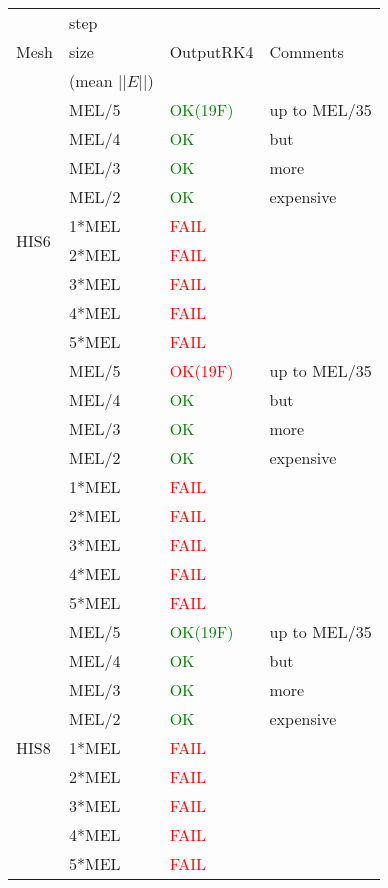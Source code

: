 \documentclass{article}
\begin{document}




\begin{tabular}{ |l|l|l|l| }
\hline
\multirow{3}{*}{Mesh} & step  & \multirow{3}{*}{OutputRK4}  & \multirow{3}{*}{Comments} \\
 & size & & \\
 & (mean $||E||$) & & \\ \hline

 
\multirow{10}{*}{HIS6} & MEL/5 & \textcolor{green}{OK(19F)}& up to MEL/35\\ 
& MEL/4 & \textcolor{green}{OK} & but \\
 & MEL/3 &  \textcolor{green}{OK} & more \\
 & MEL/2 &  \textcolor{green}{OK} & expensive\\
 & 1*MEL &    \textcolor{red}{FAIL} & \\ 
 & 2*MEL & \textcolor{red}{FAIL} & \\
 & 3*MEL &  \textcolor{red}{FAIL} & \\
 & 4*MEL &  \textcolor{red}{FAIL} & \\
 & 5*MEL &    \textcolor{red}{FAIL} & \\ \hline
 
\multirow{10}{*}{HIS7} & MEL/5 & \textcolor{red}{OK(19F)}& up to MEL/35\\ 
& MEL/4 & \textcolor{green}{OK} & but \\
 & MEL/3 &  \textcolor{green}{OK} & more \\
 & MEL/2 &  \textcolor{green}{OK} & expensive\\
 & 1*MEL &    \textcolor{red}{FAIL} & \\ 
 & 2*MEL & \textcolor{red}{FAIL} & \\
 & 3*MEL &  \textcolor{red}{FAIL} & \\
 & 4*MEL &  \textcolor{red}{FAIL} & \\
 & 5*MEL &    \textcolor{red}{FAIL} & \\ \hline
 
\multirow{10}{*}{HIS8} & MEL/5 & \textcolor{green}{OK(19F)}& up to MEL/35\\ 
& MEL/4 & \textcolor{green}{OK} & but \\
 & MEL/3 &  \textcolor{green}{OK} & more \\
 & MEL/2 &  \textcolor{green}{OK} & expensive\\
 & 1*MEL &    \textcolor{red}{FAIL} & \\ 
 & 2*MEL & \textcolor{red}{FAIL} & \\
 & 3*MEL &  \textcolor{red}{FAIL} & \\
 & 4*MEL &  \textcolor{red}{FAIL} & \\
 & 5*MEL &    \textcolor{red}{FAIL} & \\ \hline
 

\end{tabular}
\end{document}
